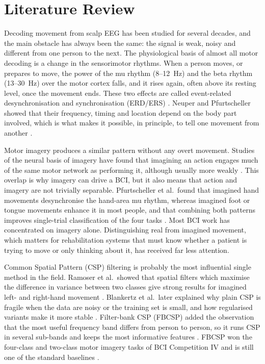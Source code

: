 \documentclass[pdflatex,sn-mathphys-num]{sn-jnl}%
\theoremstyle{thmstyleone}%
\theoremstyle{thmstyletwo}%
\theoremstyle{thmstylethree}%
\begin{document}
\section{Literature Review}\label{sec:related}

Decoding movement from scalp EEG has been studied for several decades, and the main obstacle has always been the same: the signal is weak, noisy and different from one person to the next. The physiological basis of almost all motor decoding is a change in the sensorimotor rhythms. When a person moves, or prepares to move, the power of the mu rhythm (8--12~Hz) and the beta rhythm (13--30~Hz) over the motor cortex falls, and it rises again, often above its resting level, once the movement ends. These two effects are called event-related desynchronisation and synchronisation (ERD/ERS) \citep{PfurtschellerAranibar1977,PfurtschellerLopes1999}. Neuper and Pfurtscheller showed that their frequency, timing and location depend on the body part involved, which is what makes it possible, in principle, to tell one movement from another \citep{Neuper2001}.

Motor imagery produces a similar pattern without any overt movement. Studies of the neural basis of imagery have found that imagining an action engages much of the same motor network as performing it, although usually more weakly \citep{Munzert2009}. This overlap is why imagery can drive a BCI, but it also means that action and imagery are not trivially separable. Pfurtscheller et al.\ found that imagined hand movements desynchronise the hand-area mu rhythm, whereas imagined foot or tongue movements enhance it in most people, and that combining both patterns improves single-trial classification of the four tasks \citep{Pfurtscheller2006}. Most BCI work has concentrated on imagery alone. Distinguishing real from imagined movement, which matters for rehabilitation systems that must know whether a patient is trying to move or only thinking about it, has received far less attention.

Common Spatial Pattern (CSP) filtering is probably the most influential single method in the field. Ramoser et al.\ showed that spatial filters which maximise the difference in variance between two classes give strong results for imagined left- and right-hand movement \citep{Ramoser2000}. Blankertz et al.\ later explained why plain CSP is fragile when the data are noisy or the training set is small, and how regularised variants make it more stable \citep{Blankertz2008}. Filter-bank CSP (FBCSP) added the observation that the most useful frequency band differs from person to person, so it runs CSP in several sub-bands and keeps the most informative features \citep{Ang2012}. FBCSP won the four-class and two-class motor imagery tasks of BCI Competition IV and is still one of the standard baselines \citep{Tangermann2012}.
\end{document}
